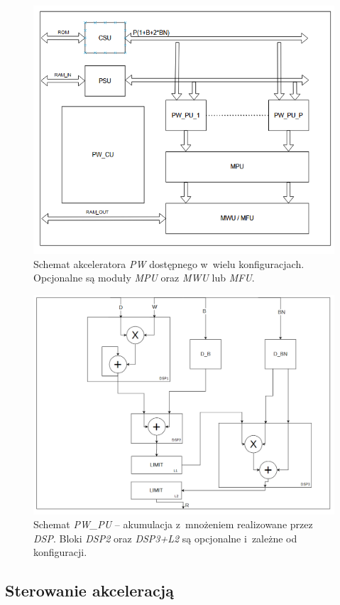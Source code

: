 \begin{figure}
    \centering
    \includegraphics[width=0.9\linewidth]{images/PWACC.png}
    \caption{Schemat akceleratora \emph{PW} dostępnego w~wielu konfiguracjach.
    Opcjonalne są moduły \emph{MPU} oraz \emph{MWU} lub \emph{MFU}.}
    \label{fig:pwacc}
\end{figure}
\begin{figure}
    \centering
    \includegraphics[width=0.8\linewidth]{images/PW_PU.png}
    \caption{Schemat \emph{PW\_PU} -- akumulacja z~mnożeniem realizowane przez \emph{DSP}. Bloki \emph{DSP2} oraz \emph{DSP3+L2} są opcjonalne i~zależne od konfiguracji.}
    \label{fig:pwpu}
\end{figure}

\subsection{Sterowanie akceleracją}

